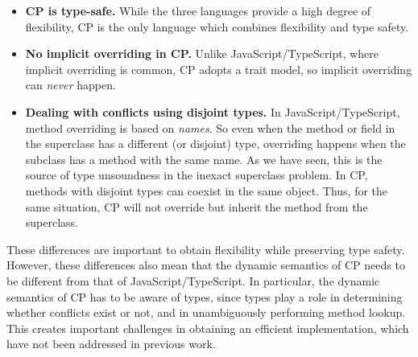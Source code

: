 \begin{itemize}

\item \textbf{CP is type-safe.}
      While the three languages provide a high degree of flexibility, CP is the
      only language which combines flexibility and type safety.

\item \textbf{No implicit overriding in CP.}
      Unlike JavaScript/TypeScript, where implicit overriding is common, CP
      adopts a trait model, so implicit overriding can \emph{never} happen.

\item \textbf{Dealing with conflicts using disjoint types.}
      In JavaScript/TypeScript, method overriding is based on \emph{names}. So
      even when the method or field in the superclass has a different (or
      disjoint) type, overriding happens when the subclass has a method with the
      same name. As we have seen, this is the source of type unsoundness in the
      inexact superclass problem. In CP, methods with disjoint types can coexist
      in the same object. Thus, for the same situation, CP will not override but
      inherit the method from the superclass.
\end{itemize}

\noindent
These differences are important to obtain flexibility while preserving type
safety. However, these differences also mean that the dynamic semantics of CP
needs to be different from that of JavaScript/TypeScript. In particular, the
dynamic semantics of CP has to be aware of types, since types play a role in
determining whether conflicts exist or not, and in unambiguously performing
method lookup. This creates important challenges in obtaining an efficient
implementation, which have not been addressed in previous work.
